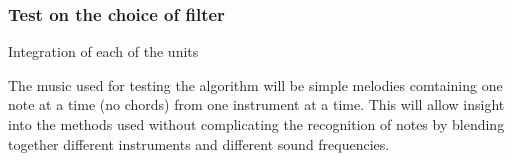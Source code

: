 \subsubsection{Test on the choice of filter}


Integration of each of the units 





The music used for testing the algorithm will be simple melodies comtaining one note at a time (no chords) from one instrument at a time. This will allow insight into the methods used without complicating the recognition of notes by blending together different instruments and different sound frequencies.\\\\

